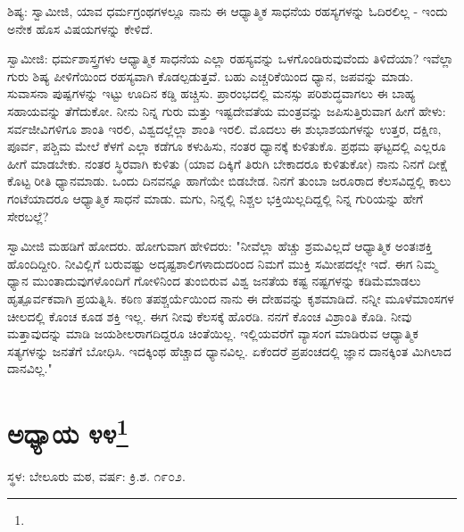 ಶಿಷ್ಯ: ಸ್ವಾಮೀಜಿ, ಯಾವ ಧರ್ಮಗ್ರಂಥಗಳಲ್ಲೂ ನಾನು ಈ ಆಧ್ಯಾತ್ಮಿಕ ಸಾಧನೆಯ ರಹಸ್ಯಗಳನ್ನು ಓದಿರಲಿಲ್ಲ - ಇಂದು ಅನೇಕ ಹೊಸ ವಿಷಯಗಳನ್ನು ಕೇಳಿದೆ.

ಸ್ವಾಮೀಜಿ: ಧರ್ಮಶಾಸ್ತ್ರಗಳು ಆಧ್ಯಾತ್ಮಿಕ ಸಾಧನೆಯ ಎಲ್ಲಾ ರಹಸ್ಯವನ್ನು ಒಳಗೊಂಡಿರುವುವೆಂದು ತಿಳಿದೆಯಾ? ಇವೆಲ್ಲಾ ಗುರು ಶಿಷ್ಯ ಪೀಳಿಗೆಯಿಂದ ರಹಸ್ಯವಾಗಿ ಕೊಡಲ್ಪಡುತ್ತವೆ. ಬಹು ಎಚ್ಚರಿಕೆಯಿಂದ ಧ್ಯಾನ, ಜಪವನ್ನು ಮಾಡು. ಸುವಾಸನಾ ಪುಷ್ಪಗಳನ್ನು ಇಟ್ಟು ಊದಿನ ಕಡ್ಡಿ ಹಚ್ಚಿಸು. ಪ್ರಾರಂಭದಲ್ಲಿ ಮನಸ್ಸು ಪರಿಶುದ್ಧವಾಗಲು ಈ ಬಾಹ್ಯ ಸಹಾಯವನ್ನು ತೆಗೆದುಕೋ. ನೀನು ನಿನ್ನ ಗುರು ಮತ್ತು ಇಷ್ಟದೇವತೆಯ ಮಂತ್ರವನ್ನು ಜಪಿಸುತ್ತಿರುವಾಗ ಹೀಗೆ ಹೇಳು: ಸರ್ವಜೀವಿಗಳಿಗೂ ಶಾಂತಿ ಇರಲಿ, ವಿಶ್ವದಲ್ಲೆಲ್ಲಾ ಶಾಂತಿ ಇರಲಿ. ಮೊದಲು ಈ ಶುಭಾಶಯಗಳನ್ನು ಉತ್ತರ, ದಕ್ಷಿಣ, ಪೂರ್ವ, ಪಶ್ಚಿಮ ಮೇಲೆ ಕೆಳಗೆ ಎಲ್ಲಾ ಕಡೆಗೂ ಕಳುಹಿಸು, ನಂತರ ಧ್ಯಾನಕ್ಕೆ ಕುಳಿತುಕೊ. ಪ್ರಥಮ ಘಟ್ಟದಲ್ಲಿ ಎಲ್ಲರೂ ಹೀಗೆ ಮಾಡಬೇಕು. ನಂತರ ಸ್ಥಿರವಾಗಿ ಕುಳಿತು (ಯಾವ ದಿಕ್ಕಿಗೆ ತಿರುಗಿ ಬೇಕಾದರೂ ಕುಳಿತುಕೋ) ನಾನು ನಿನಗೆ ದೀಕ್ಷೆ ಕೊಟ್ಟ ರೀತಿ ಧ್ಯಾನಮಾಡು. ಒಂದು ದಿನವನ್ನೂ ಹಾಗೆಯೇ ಬಿಡಬೇಡ. ನಿನಗೆ ತುಂಬಾ ಜರೂರಾದ ಕೆಲಸವಿದ್ದಲ್ಲಿ ಕಾಲು ಗಂಟೆಯಾದರೂ ಆಧ್ಯಾತ್ಮಿಕ ಸಾಧನೆ ಮಾಡು. ಮಗು, ನಿನ್ನಲ್ಲಿ ನಿಶ್ಚಲ ಭಕ್ತಿಯಿಲ್ಲದಿದ್ದಲ್ಲಿ ನಿನ್ನ ಗುರಿಯನ್ನು ಹೇಗೆ ಸೇರಬಲ್ಲೆ?

ಸ್ವಾಮೀಜಿ ಮಹಡಿಗೆ ಹೋದರು. ಹೋಗುವಾಗ ಹೇಳಿದರು: "ನೀವೆಲ್ಲಾ ಹೆಚ್ಚು ಶ್ರಮವಿಲ್ಲದೆ ಆಧ್ಯಾತ್ಮಿಕ ಅಂತಃಶಕ್ತಿ ಹೊಂದಿದ್ದೀರಿ. ನೀವಿಲ್ಲಿಗೆ ಬರುವಷ್ಟು ಅದೃಷ್ಟಶಾಲಿಗಳಾದುದರಿಂದ ನಿಮಗೆ ಮುಕ್ತಿ ಸಮೀಪದಲ್ಲೇ ಇದೆ. ಈಗ ನಿಮ್ಮ ಧ್ಯಾನ ಮುಂತಾದುವುಗಳೊಂದಿಗೆ ಗೋಳಿನಿಂದ ತುಂಬಿರುವ ವಿಶ್ವ ಜನತೆಯ ಕಷ್ಟ ನಷ್ಟಗಳನ್ನು ಕಡಿಮೆಮಾಡಲು ಹೃತ್ಪೂರ್ವಕವಾಗಿ ಪ್ರಯತ್ನಿಸಿ. ಕಠಿಣ ತಪಶ್ಚರ್ಯೆಯಿಂದ ನಾನು ಈ ದೇಹವನ್ನು ಕೃಶಮಾಡಿದೆ. ನನ್ನೀ ಮೂಳೆಮಾಂಸಗಳ ಚೀಲದಲ್ಲಿ ಕೊಂಚ ಕೂಡ ಶಕ್ತಿ ಇಲ್ಲ. ಈಗ ನೀವು ಕೆಲಸಕ್ಕೆ ಹೊರಡಿ. ನನಗೆ ಕೊಂಚ ವಿಶ್ರಾಂತಿ ಕೊಡಿ. ನೀವು ಮತ್ತಾವುದನ್ನು ಮಾಡಿ ಜಯಶೀಲರಾಗದಿದ್ದರೂ ಚಿಂತೆಯಿಲ್ಲ. ಇಲ್ಲಿಯವರೆಗೆ ವ್ಯಾಸಂಗ ಮಾಡಿರುವ ಆಧ್ಯಾತ್ಮಿಕ ಸತ್ಯಗಳನ್ನು ಜನತೆಗೆ ಬೋಧಿಸಿ. ಇದಕ್ಕಿಂಥ ಹೆಚ್ಚಾದ ಧ್ಯಾನವಿಲ್ಲ. ಏಕೆಂದರೆ ಪ್ರಪಂಚದಲ್ಲಿ ಜ್ಞಾನ ದಾನಕ್ಕಿಂತ ಮಿಗಿಲಾದ ದಾನವಿಲ್ಲ."

\newpage

\chapter[ಅಧ್ಯಾಯ ೪೪]{ಅಧ್ಯಾಯ ೪೪\protect\footnote{}}

\begin{center}
ಸ್ಥಳ: ಬೇಲೂರು ಮಠ, ವರ್ಷ: ಕ್ರಿ.ಶ. ೧೯೦೨.
\end{center}

